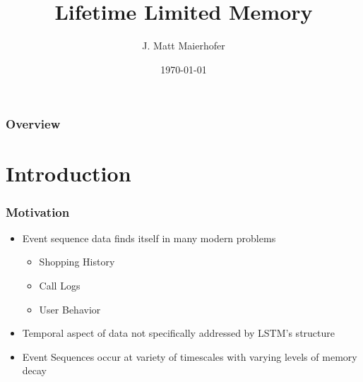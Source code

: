 \documentclass{beamer}
\title[LLM]{Lifetime Limited Memory} %
\author{J. Matt Maierhofer} %
\institute[CU] %
{
University of Colorado \\ %
\medskip
\textit{} %
}
\date{\today} %
\begin{document}
\begin{frame}
\titlepage %
\end{frame}

\begin{frame}
\frametitle{Overview} %
\tableofcontents %
\end{frame}


\section{Introduction} %


\begin{frame}
\frametitle{Motivation}
\begin{itemize}
\item Event sequence data finds itself in many modern problems
\begin{itemize}
    \item Shopping History
    \item Call Logs
    \item User Behavior
\end{itemize}
\item Temporal aspect of data not specifically addressed by LSTM's structure
\item Event Sequences occur at variety of timescales with varying levels of memory decay
\end{itemize}
\end{frame}
\end{document}
